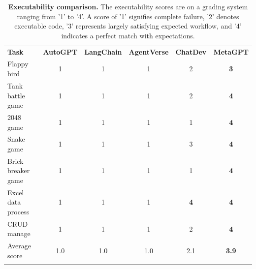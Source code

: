 \begin{table}[htb]
  \centering
      \caption{\textbf{Executability comparison.} The executability scores are on a grading system ranging from '1' to '4'. A score of '1' signifies complete failure, '2' denotes executable code, '3' represents largely satisfying expected workflow, and '4' indicates a perfect match with expectations.}
      \label{tab:task_executability}
\renewcommand\tabcolsep{8pt}
\renewcommand\arraystretch{1.2}
  \begin{tabular}{l|ccccc} %
\Xhline{1.5pt}
\rowcolor{paleaqua} 
\textbf{Task} & \textbf{AutoGPT} & \textbf{LangChain} & \textbf{AgentVerse}& \textbf{ChatDev} & \textbf{MetaGPT} \\
\Xhline{1.5pt}
Flappy bird&1&1&1&2&\textbf{3} \\
\rowcolor{gray!20} Tank battle game&1&1&1&2&\textbf{4} \\
2048 game&1&1&1&1&\textbf{4} \\
\rowcolor{gray!20} Snake game&1&1&1&3&\textbf{4} \\
Brick breaker game&1&1&1&1&\textbf{4} \\
\rowcolor{gray!20} Excel data process&1&1&1&\textbf{4}&\textbf{4} \\
CRUD manage&1&1&1&2&\textbf{4} \\
\Xhline{1pt}
\rowcolor{gray!20} Average score &1.0&1.0 &1.0&2.1&\textbf{3.9} \\
\Xhline{1.5pt}
\end{tabular}
\end{table}